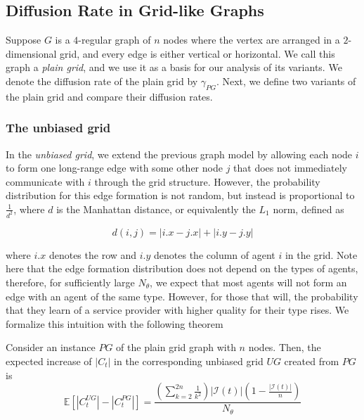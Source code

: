 \documentclass[format=acmsmall, review=false]{acmart}
\begin{document}
\subsection{Diffusion Rate in Grid-like Graphs}

\par Suppose $G$ is a $4$-regular graph of $n$ nodes where the vertex are arranged in a $2$-dimensional grid, and every edge
is either vertical or horizontal. We call this graph a \textit{plain grid}, and we use it as a basis for our analysis of its
variants. We denote the diffusion rate of the plain grid by $\gamma_{PG}$. Next, we define two variants of the plain grid
and compare their diffusion rates.

\subsubsection{\textbf{The unbiased grid}}

\par In the \textit{unbiased grid}, we extend the previous graph model by allowing each node $i$ to form one long-range edge
with some other node $j$ that does not immediately communicate with $i$ through the grid structure. However, the probability
distribution for this edge formation is not random, but instead is proportional to $\frac{1}{d^2}$, where $d$ is the Manhattan
distance, or equivalently the $L_1$ norm, defined as

\[
d(i, j) = |i.x - j.x| + |i.y - j.y|
\]

where $i.x$ denotes the row and $i.y$ denotes the column of agent $i$ in the grid. Note here that the edge formation
distribution does not depend on the types of agents, therefore, for sufficiently large $N_\theta$, we expect that most agents
will not form an edge with an agent of the same type. However, for those that will, the probability that they learn of a service
provider with higher quality for their type rises. We formalize this intuition with the following theorem

\begin{theorem}
Consider an instance $PG$ of the plain grid graph with $n$ nodes. Then, the expected increase of $|C_t|$ in the
corresponding unbiased grid $UG$ created from $PG$ is
\[
\mathbb{E} \left[ |C^{UG}_t| - |C^{PG}_t| \right] = \frac{\left( \sum_{k = 2}^{2n} {\frac{1}{k^2}} \right) |\mathcal{I}(t)| \left( 1 - \frac{|\mathcal{I}(t)|}{n} \right) }{N_\theta}
\]
\end{theorem}
\end{document}
